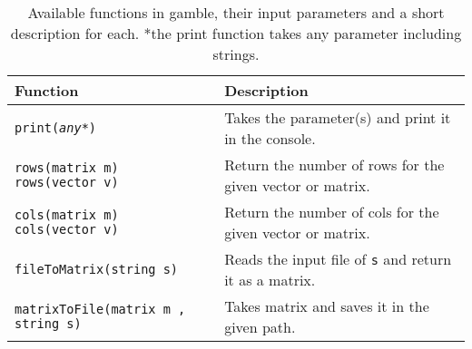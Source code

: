 \begin{table}[h]
    \centering
    \begin{tabular}{|l|p{8.5cm}|}
    \hline
    \textbf{Function}                                               &\textbf{Description}                                                                               \\ \hline
    \texttt{print(\textit{any*})}                                   &Takes the parameter(s) and print it in the console.                                                 \\ \hline 
    \parbox[t]{5cm}{\texttt{rows(matrix m)}\\\texttt{rows(vector v)}} &Return the number of rows for the given vector or matrix.                                          \\ \hline
    \parbox[t]{5cm}{\texttt{cols(matrix m)}\\\texttt{cols(vector v)}} &Return the number of cols for the given vector or matrix.                                          \\ \hline    
    \texttt{fileToMatrix(string s)}                                 &Reads the input file of \texttt{s} and return it as a matrix.                                        \\ \hline
    \texttt{matrixToFile(matrix m , string s)}                      &Takes matrix and saves it in the given path.                                                       \\ \hline  
    \end{tabular}
    \caption{Available functions in \gls{gamble}, their input parameters and a short description for each. *the print function takes any parameter including strings.}\label{tbl:funcs}
\end{table}
